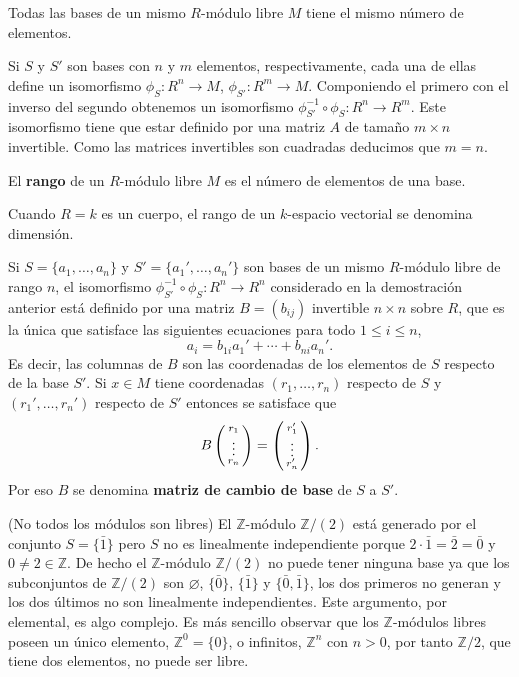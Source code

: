 
Todas las bases de un mismo \(R\)-módulo libre \(M\) tiene el mismo
número de elementos. 


Si \(S\) y \(S'\) son bases con \(n\) y \(m\) elementos,
respectivamente, cada una de ellas define un isomorfismo
\(\phi_S\colon R^n\rightarrow M\),
\(\phi_{S'}\colon R^m\rightarrow M\). Componiendo el primero con el
inverso del segundo obtenemos un isomorfismo
\(\phi_{S'}^{-1}\circ\phi_S\colon R^n\rightarrow R^m\). Este
isomorfismo tiene que estar definido por una matriz \(A\) de tamaño
\(m\times n\) invertible. Como las matrices invertibles son cuadradas
deducimos que \(m=n\). 


El \textbf{rango} de un \(R\)-módulo libre \(M\) es el número de
elementos de una base. 

Cuando \(R=k\) es un cuerpo, el rango de un \(k\)-espacio vectorial se
denomina dimensión.


Si \(S=\{a_1,\dots,a_n\}\) y \(S'=\{a_1',\dots,a_n'\}\) son
bases de un mismo \(R\)-módulo libre de rango \(n\), el isomorfismo
\(\phi_{S'}^{-1}\circ\phi_S\colon R^n\rightarrow R^n\) considerado en
la demostración anterior está definido por una matriz \(B=(b_{ij})\)
invertible \(n\times n\) sobre \(R\), que es la única que satisface las
siguientes ecuaciones para todo \(1\leq i\leq n\),
\[a_i=b_{1i}a_1'+\cdots+b_{ni}a_n'.\] Es decir, las columnas de
\(B\) son las coordenadas de los elementos de \(S\) respecto de la base
\(S'\). Si \(x\in M\) tiene coordenadas \((r_1,\dots, r_n)\) respecto
de \(S\) y \((r_1',\dots, r_n')\) respecto de \(S'\) entonces se
satisface que
\[B\left(\begin{smallmatrix}r_1\cr\vdots\cr r_n\end{smallmatrix}\right)=\left(\begin{smallmatrix}r_1'\cr\vdots\cr r_n'\end{smallmatrix}\right).\]
Por eso \(B\) se denomina \textbf{matriz de cambio de base} de \(S\) a
\(S'\). 

\textrm{\normalfont (No todos los módulos son libres)} El
\(\mathbb Z\)-módulo \(\mathbb Z/(2)\) está generado por el conjunto
\(S=\{\bar 1\}\) pero \(S\) no es linealmente independiente porque
\(2\cdot\bar 1=\bar 2=\bar 0\) y \(0\neq 2\in\mathbb Z\). De hecho el
\(\mathbb Z\)-módulo \(\mathbb Z/(2)\) no puede tener ninguna base ya
que los subconjuntos de \(\mathbb Z/(2)\) son \(\varnothing\),
\(\{\bar 0\}\), \(\{\bar 1\}\) y \(\{\bar 0,\bar 1\}\), los dos
primeros no generan y los dos últimos no son linealmente independientes.
Este argumento, por elemental, es algo complejo. Es más sencillo
observar que los \(\mathbb Z\)-módulos libres poseen un único elemento,
\(\mathbb Z^0=\{0\}\), o infinitos, \(\mathbb Z^n\) con \(n>0\), por
tanto \(\mathbb Z/2\), que tiene dos elementos, no puede ser libre.

